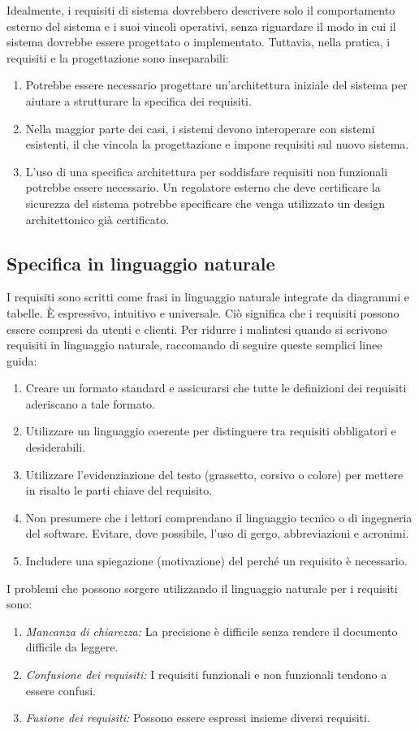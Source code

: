Idealmente, i requisiti di sistema dovrebbero descrivere solo il comportamento esterno del sistema e i suoi vincoli operativi, senza riguardare il modo in cui il sistema dovrebbe essere progettato o implementato. Tuttavia, nella pratica, i requisiti e la progettazione sono inseparabili:
\begin{enumerate}
    \item Potrebbe essere necessario progettare un'architettura iniziale del sistema per aiutare a strutturare la specifica dei requisiti.
    \item Nella maggior parte dei casi, i sistemi devono interoperare con sistemi esistenti, il che vincola la progettazione e impone requisiti sul nuovo sistema.
    \item L'uso di una specifica architettura per soddisfare requisiti non funzionali potrebbe essere necessario. Un regolatore esterno che deve certificare la sicurezza del sistema potrebbe specificare che venga utilizzato un design architettonico già certificato.
\end{enumerate}

\subsection{Specifica in linguaggio naturale}
I requisiti sono scritti come frasi in linguaggio naturale integrate da diagrammi e tabelle. È espressivo, intuitivo e universale. Ciò significa che i requisiti possono essere compresi da utenti e clienti. Per ridurre i malintesi quando si scrivono requisiti in linguaggio naturale, raccomando di seguire queste semplici linee guida:
\begin{enumerate}
    \item Creare un formato standard e assicurarsi che tutte le definizioni dei requisiti aderiscano a tale formato.
    \item Utilizzare un linguaggio coerente per distinguere tra requisiti obbligatori e desiderabili. 
    \item Utilizzare l’evidenziazione del testo (grassetto, corsivo o colore) per mettere in risalto le parti chiave del requisito.
    \item Non presumere che i lettori comprendano il linguaggio tecnico o di ingegneria del software. Evitare, dove possibile, l'uso di gergo, abbreviazioni e acronimi.
    \item Includere una spiegazione (motivazione) del perché un requisito è necessario.
\end{enumerate}
I problemi che possono sorgere utilizzando il linguaggio naturale per i requisiti sono:
\begin{enumerate}
    \item \textit{Mancanza di chiarezza:} La precisione è difficile senza rendere il documento difficile da leggere. 
    \item \textit{Confusione dei requisiti:} I requisiti funzionali e non funzionali tendono a essere confusi. 
    \item \textit{Fusione dei requisiti:} Possono essere espressi insieme diversi requisiti.
\end{enumerate}


